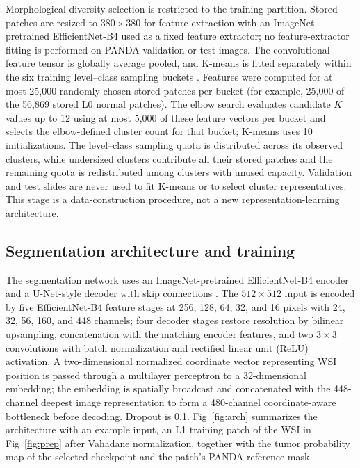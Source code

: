 \documentclass[10pt,letterpaper]{article}
\begin{document}
Morphological diversity selection is restricted to the training partition. Stored patches are resized to $380\times380$ for feature extraction with an ImageNet-pretrained EfficientNet-B4 used as a fixed feature extractor; no feature-extractor fitting is performed on PANDA validation or test images. The convolutional feature tensor is globally average pooled, and K-means is fitted separately within the six training level--class sampling buckets \cite{bib34}. Features were computed for at most 25,000 randomly chosen stored patches per bucket (for example, 25,000 of the 56,869 stored L0 normal patches). The elbow search evaluates candidate $K$ values up to 12 using at most 5,000 of these feature vectors per bucket and selects the elbow-defined cluster count for that bucket; K-means uses 10 initializations. The level--class sampling quota is distributed across its observed clusters, while undersized clusters contribute all their stored patches and the remaining quota is redistributed among clusters with unused capacity. Validation and test slides are never used to fit K-means or to select cluster representatives. This stage is a data-construction procedure, not a new representation-learning architecture.

\subsection*{Segmentation architecture and training}
The segmentation network uses an ImageNet-pretrained EfficientNet-B4 encoder and a U-Net-style decoder with skip connections \cite{bib29,bib30}. The $512\times512$ input is encoded by five EfficientNet-B4 feature stages at 256, 128, 64, 32, and 16 pixels with 24, 32, 56, 160, and 448 channels; four decoder stages restore resolution by bilinear upsampling, concatenation with the matching encoder features, and two $3\times3$ convolutions with batch normalization and rectified linear unit (ReLU) activation. A two-dimensional normalized coordinate vector representing WSI position is passed through a multilayer perceptron to a 32-dimensional embedding; the embedding is spatially broadcast and concatenated with the 448-channel deepest image representation to form a 480-channel coordinate-aware bottleneck before decoding. Dropout is 0.1. Fig~\ref{fig:arch} summarizes the architecture with an example input, an L1 training patch of the WSI in Fig~\ref{fig:prep} after Vahadane normalization, together with the tumor probability map of the selected checkpoint and the patch's PANDA reference mask.
\end{document}
